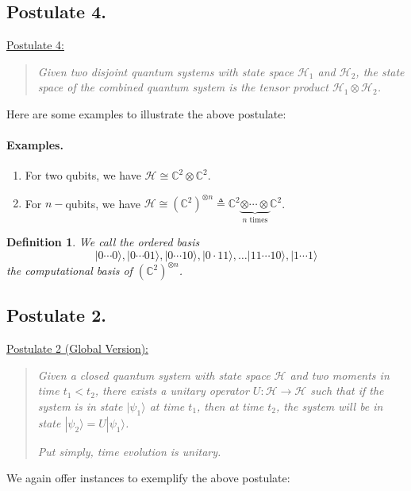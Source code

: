 \documentclass{article}
\newtheorem*{dfn}{Definition}
\newcommand{\ket}[1]{|#1\rangle}
\newcommand{\bbC}{\mathbb{C}}
\newcommand{\calH}{\mathcal{H}}
\newcommand{\qbit}{\bbC^2}
\newcommand{\qbits}[1]{(\qbit)^{\otimes #1}}
\begin{document}
\subsection{Postulate 4.}
\begin{framed}
\underline{Postulate 4:}
\begin{quote}
\textit{Given two disjoint quantum systems with state space $\calH_1$ and $\calH_2$, the state space of the combined quantum system is the tensor product $\calH_1 \otimes \calH_2$.}
\end{quote}
\end{framed}
Here are some examples to illustrate the above postulate:
\paragraph{Examples.}
\begin{enumerate}
    \item For two qubits, we have $\calH \cong \bbC^2 \otimes \bbC^2$.
    \item For $n-$qubits, we have $\calH \cong (\bbC^2)^{\otimes n} \triangleq \bbC^2 \underbrace{\otimes \cdots \otimes}_{n \text{ times}} \bbC^2$.
\end{enumerate}
\begin{dfn}
We call the ordered basis 
\[
	\ket{0 \cdots 0}, \ket{0 \cdots 01}, \ket{0 \cdots 10}, \ket{0 \cdot 11}, \ldots \ket{11 \cdots 10}, \ket{1 \cdots 1}
\]
the {\em computational basis} of $\qbits{n}$.
\end{dfn}

\subsection{Postulate 2.}
\begin{framed}
\underline{Postulate 2 (Global Version):}
\begin{quote}
	\textit{Given a closed quantum system with state space $\calH$ and two moments in time $t_1 < t_2$, there exists a unitary operator $U: \calH \to \calH$ such that if the system is in state $\ket{\psi_1}$ at time $t_1$, then at time $t_2$, the system will be in state $\ket{\psi_2} = U\ket{\psi_1}$.}

\textit{Put simply, time evolution is unitary.}
\end{quote}
\end{framed}
We again offer instances to exemplify the above postulate:
\end{document}
